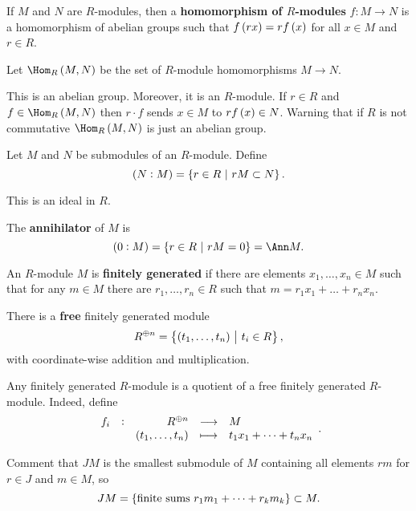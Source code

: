 \begin{definition}
If $ M $ and $ N $ are $ R $-modules, then a \textbf{homomorphism of $ R $-modules} $ f : M \to N $ is a homomorphism of abelian groups such that $ f\br{rx} = rf\br{x} $ for all $ x \in M $ and $ r \in R $.
\end{definition}

\begin{definition}
Let $ \Hom_R\br{M, N} $ be the set of $ R $-module homomorphisms $ M \to N $.
\end{definition}

This is an abelian group. Moreover, it is an $ R $-module. If $ r \in R $ and $ f \in \Hom_R\br{M, N} $ then $ r \cdot f $ sends $ x \in M $ to $ rf\br{x} \in N $. Warning that if $ R $ is not commutative $ \Hom_R\br{M, N} $ is just an abelian group.

\begin{definition}
Let $ M $ and $ N $ be submodules of an $ R $-module. Define
$$ \br{N : M} = \cbr{r \in R \st rM \subset N}. $$
\end{definition}

This is an ideal in $ R $.

\begin{example*}
The \textbf{annihilator} of $ M $ is
$$ \br{0 : M} = \cbr{r \in R \st rM = 0} = \Ann M. $$
\end{example*}

\pagebreak

\begin{definition}
An $ R $-module $ M $ is \textbf{finitely generated} if there are elements $ x_1, \dots, x_n \in M $ such that for any $ m \in M $ there are $ r_1, \dots, r_n \in R $ such that $ m = r_1x_1 + \dots + r_nx_n $.
\end{definition}

\begin{example*}
There is a \textbf{free} finitely generated module
$$ R^{\oplus n} = \cbr{\br{t_1, \dots, t_n} \st t_i \in R}, $$
with coordinate-wise addition and multiplication.
\end{example*}

\begin{remark*}
Any finitely generated $ R $-module is a quotient of a free finitely generated $ R $-module. Indeed, define
$$ \function[f_i]{R^{\oplus n}}{M}{\br{t_1, \dots, t_n}}{t_1x_1 + \dots + t_nx_n}. $$
\end{remark*}

Comment that $ JM $ is the smallest submodule of $ M $ containing all elements $ rm $ for $ r \in J $ and $ m \in M $, so
$$ JM = \cbr{\text{finite sums} \ r_1m_1 + \dots + r_km_k} \subset M. $$

